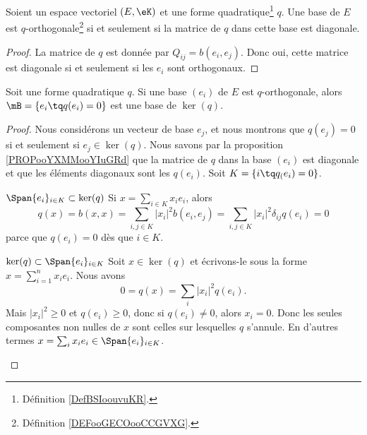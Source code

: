 \begin{proposition}       \label{PROPooYXMMooYIuGRd}
    Soient un espace vectoriel \( (E,\eK)\) et une forme quadratique\footnote{Définition \ref{DefBSIoouvuKR}.} \( q\). Une base de \( E\) est \( q\)-orthogonale\footnote{Définition \ref{DEFooGECOooCCGVXG}.} si et seulement si la matrice de \( q\) dans cette base est diagonale.
\end{proposition}

\begin{proof}
    La matrice de \( q\) est donnée par \( Q_{ij}=b(e_i,e_j)\). Donc oui, cette matrice est diagonale si et seulement si les \( e_i\) sont orthogonaux.
\end{proof}

\begin{proposition}
    Soit une forme quadratique \( q\). Si une base \( (e_i )\) de \( E\) est \( q\)-orthogonale, alors \( \mB=\{ e_i\tq q(e_i)=0 \}\) est une base de \( \ker(q)\).
\end{proposition}

\begin{proof}
    Nous considérons un vecteur de base \( e_j\), et nous montrons que \( q(e_j)=0\) si et seulement si \( e_j\in\ker(q)\). Nous savons par la proposition \ref{PROPooYXMMooYIuGRd} que la matrice de \( q\) dans la base \( (e_i)\) est diagonale et que les éléments diagonaux sont les \( q(e_i)\). Soit \( K=\{ i\tq q_(e_i)=0 \}\).
    \begin{subproof}
    \item[\( \Span\{ e_i \}_{i\in K}\subset\ker(q)\)]
        Si \( x=\sum_{i\in K}x_ie_i\), alors 
        \begin{equation}
            q(x)=b(x,x)=\sum_{i,j\in K}| x_i |^2b(e_i,e_j)=\sum_{i,j\in K}| x_i |^2\delta_{ij}q(e_i)=0
        \end{equation}
        parce que \( q(e_i)=0\) dès que \( i\in K\).
        \item{\( \ker(q)\subset\Span\{ e_i \}_{i\in K}\)}
            Soit \( x\in \ker(q)\) et écrivons-le sous la forme \( x=\sum_{i=1}^nx_ie_i\). Nous avons
            \begin{equation}
                0=q(x)=\sum_i| x_i |^2q(e_i).
            \end{equation}
            Mais \(    | x_i |^2\geq 0 \) et \( q(e_i)\geq 0\), donc si \( q(e_i)\neq 0\), alors \( x_i=0\). Donc les seules composantes non nulles de \( x\) sont celles sur lesquelles \( q\) s'annule. En d'autres termes \( x=\sum_ix_ie_i\in \Span\{ e_i \}_{i\in K}\).
    \end{subproof}
\end{proof}

